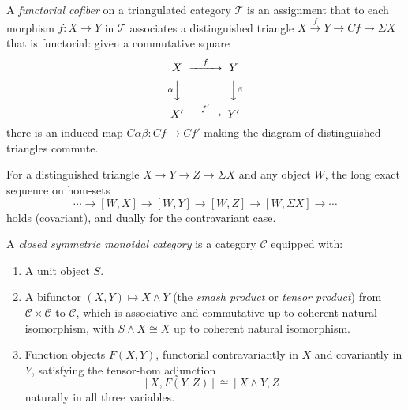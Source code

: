 \begin{definition}\label{prereq:def:functorial-cofiber}
    \leanok
    A \emph{functorial cofiber} on a triangulated category $\mathcal{T}$ is an assignment that to each morphism $f: X \to Y$ in $\mathcal{T}$ associates a distinguished triangle $X \xrightarrow{f} Y \to Cf \to \Sigma X$ that is functorial: given a commutative square
    $$\begin{CD}
    X @>{f}>> Y \\
    @V{\alpha}VV @VV{\beta}V \\
    X' @>{f'}>> Y'
    \end{CD}$$
    there is an induced map $C\alpha\beta: Cf \to Cf'$ making the diagram of distinguished triangles commute.
\end{definition}

\begin{proposition}\label{prereq:prop:les-hom}
    For a distinguished triangle $X \to Y \to Z \to \Sigma X$ and any object $W$, the long exact sequence on hom-sets
    $$\cdots \to [W, X] \to [W, Y] \to [W, Z] \to [W, \Sigma X] \to \cdots$$
    holds (covariant), and dually for the contravariant case.
\end{proposition}

\begin{definition}\label{prereq:def:closed-symmetric-monoidal}
    A \emph{closed symmetric monoidal category} is a category $\mathcal{C}$ equipped with:
    \begin{enumerate}
        \item A unit object $S$.
        \item A bifunctor $(X, Y) \mapsto X \wedge Y$ (the \emph{smash product} or \emph{tensor product}) from $\mathcal{C} \times \mathcal{C}$ to $\mathcal{C}$, which is associative and commutative up to coherent natural isomorphism, with $S \wedge X \cong X$ up to coherent natural isomorphism.
        \item Function objects $F(X, Y)$, functorial contravariantly in $X$ and covariantly in $Y$, satisfying the tensor-hom adjunction
        $$[X, F(Y, Z)] \cong [X \wedge Y, Z]$$
        naturally in all three variables.
    \end{enumerate}
\end{definition}

